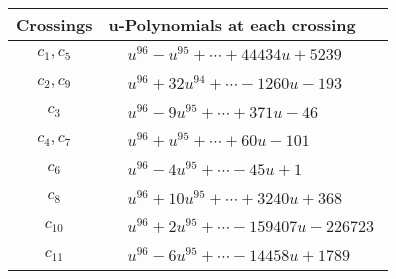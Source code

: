 \documentclass[1p]{elsarticle_modified}
\theoremstyle{definition}
\begin{document}
\begin{tabular}{m{50pt}|m{274pt}}
Crossings & \hspace{64pt}u-Polynomials at each crossing \\
\hline $$\begin{aligned}c_{1},c_{5}\end{aligned}$$&$\begin{aligned}
&u^{96}- u^{95}+\cdots+44434 u+5239
\end{aligned}$\\
\hline $$\begin{aligned}c_{2},c_{9}\end{aligned}$$&$\begin{aligned}
&u^{96}+32 u^{94}+\cdots-1260 u-193
\end{aligned}$\\
\hline $$\begin{aligned}c_{3}\end{aligned}$$&$\begin{aligned}
&u^{96}-9 u^{95}+\cdots+371 u-46
\end{aligned}$\\
\hline $$\begin{aligned}c_{4},c_{7}\end{aligned}$$&$\begin{aligned}
&u^{96}+u^{95}+\cdots+60 u-101
\end{aligned}$\\
\hline $$\begin{aligned}c_{6}\end{aligned}$$&$\begin{aligned}
&u^{96}-4 u^{95}+\cdots-45 u+1
\end{aligned}$\\
\hline $$\begin{aligned}c_{8}\end{aligned}$$&$\begin{aligned}
&u^{96}+10 u^{95}+\cdots+3240 u+368
\end{aligned}$\\
\hline $$\begin{aligned}c_{10}\end{aligned}$$&$\begin{aligned}
&u^{96}+2 u^{95}+\cdots-159407 u-226723
\end{aligned}$\\
\hline $$\begin{aligned}c_{11}\end{aligned}$$&$\begin{aligned}
&u^{96}-6 u^{95}+\cdots-14458 u+1789
\end{aligned}$\\
\hline
\end{tabular}\\~\\
\end{document}

